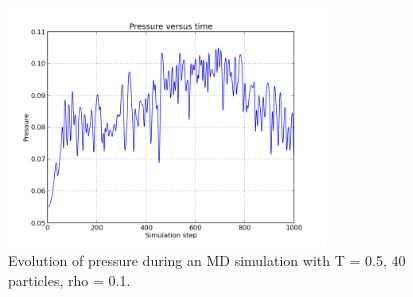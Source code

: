 \documentclass{article}
\begin{document}
\begin{enumerate}
    \begin{figure}[h!]
        \begin{center}
            \includegraphics[width=0.75\textwidth]{pressure.png}
            \caption{Evolution of pressure during an MD simulation with T = 0.5, 40 particles, rho = 0.1.}
            \label{fig:pressure}
        \end{center}
    \end{figure}

\end{enumerate}

\end{document}
